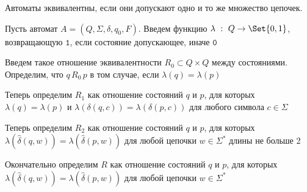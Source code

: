\documentclass[12pt]{article}
\begin{document}
\begin{enumerate}
        Автоматы эквивалентны, если они допускают одно и то же множество цепочек.

        Пусть автомат $A = (Q, \Sigma, \delta, q_0, F)$. Введем функцию $\lambda \ : \ Q \to \Set{0, 1}$, возвращающую $\mathtt{1}$, если состояние допускающее, иначе $\mathtt{0}$

        Введем такое отношение эквивалентности $R_0 \subset Q \times Q$ между состояниями. Определим, что $q \, R_0 \, p$ в том случае, если $\lambda(q) = \lambda(p)$

        Теперь определим $R_1$ как отношение состояний $q$ и $p$, для которых $\lambda(q) = \lambda(p)$ и $\lambda(\delta(q, c)) = \lambda(\delta(p, c))$ для любого символа $c \in \Sigma$

        Теперь определим $R_2$ как отношение состояний $q$ и $p$, для которых $\lambda(\hat\delta(q, w)) = \lambda(\hat\delta(p, w))$ для любой цепочки $w \in \Sigma^*$ длины не больше 2

        Окончательно определим $R$ как отношение состояний $q$ и $p$, для которых $\lambda(\hat\delta(q, w)) = \lambda(\hat\delta(p, w))$ для любой цепочки $w \in \Sigma^*$


        \begin{minipage}{\linewidth}
            \begin{figure}

            \end{figure}


\end{minipage}
\end{enumerate}
\end{document}

